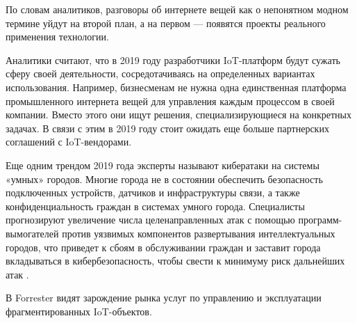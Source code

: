 По словам аналитиков, разговоры об интернете вещей как о непонятном модном термине уйдут на второй план, а на первом — появятся проекты реального применения технологии.

Аналитики считают, что в 2019 году разработчики IoT-платформ будут сужать сферу своей деятельности, сосредотачиваясь на определенных вариантах использования. Например, бизнесменам не нужна одна единственная платформа промышленного интернета вещей для управления каждым процессом в своей компании. Вместо этого они ищут решения, специализирующиеся на конкретных задачах. В связи с этим в 2019 году стоит ожидать еще больше партнерских соглашений с IoT-вендорами.

Еще одним трендом 2019 года эксперты называют кибератаки на системы «умных» городов. Многие города не в состоянии обеспечить безопасность подключенных устройств, датчиков и инфраструктуры связи, а также конфиденциальность граждан в системах умного города. Специалисты прогнозируют увеличение числа целенаправленных атак с помощью программ-вымогателей против уязвимых компонентов развертывания интеллектуальных городов, что приведет к сбоям в обслуживании граждан и заставит города вкладываться в кибербезопасность, чтобы свести к минимуму риск дальнейших атак \cite{iot_data_2019}.

В Forrester видят зарождение рынка услуг по управлению и эксплуатации фрагментированных IoT-объектов.